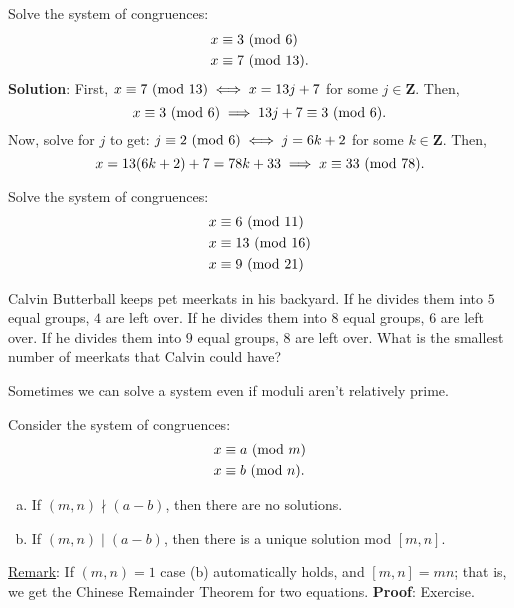 \begin{Example}{}{}
    Solve the system of congruences:
    \begin{align*}
        x & \equiv 3\ (\mathrm{mod}\ 6)   \\
        x & \equiv 7\ (\mathrm{mod}\ 13).
    \end{align*}
    \tcblower{}
    \textbf{Solution}: First, $ x\equiv 7\ (\mathrm{mod}\ 13)\iff x=13j+7 $ for some $ j\in\mathbf{Z} $. Then,
    \[ x\equiv 3\ (\mathrm{mod}\ 6)\implies 13j+7\equiv 3\ (\mathrm{mod}\ 6). \]
    Now, solve for $ j $ to get: $ j\equiv 2\ (\mathrm{mod}\ 6)\iff j=6k+2 $ for some $ k\in\mathbf{Z} $. Then,
    \[ x=13(6k+2)+7=78k+33\implies x\equiv 33\ (\mathrm{mod}\ 78). \]
\end{Example}
\begin{Exercise}{}{}
    Solve the system of congruences:
    \begin{align*}
        x & \equiv 6\ (\mathrm{mod}\ 11)  \\
        x & \equiv 13\ (\mathrm{mod}\ 16) \\
        x & \equiv 9\ (\mathrm{mod}\ 21)
    \end{align*}
\end{Exercise}
\begin{Exercise}{}{}
    Calvin Butterball keeps pet meerkats in his backyard. If he divides
    them into $5$ equal groups, $4$ are left over. If he divides them into $8$ equal groups, $6$
    are left over. If he divides them into $9$ equal groups, $8$ are left over. What is the
    smallest number of meerkats that Calvin could have?
\end{Exercise}
Sometimes we can solve a system even if moduli aren't relatively prime.
\begin{Theorem}{}{}
    Consider the system of congruences:
    \begin{align*}
        x & \equiv a\ (\mathrm{mod}\ m)  \\
        x & \equiv b\ (\mathrm{mod}\ n).
    \end{align*}
    \begin{enumerate}[(a)]
        \item If $ (m,n)\nmid (a-b) $, then there are no solutions.
        \item If $ (m,n)\mid (a-b) $, then there is a unique solution mod $ [m,n] $.
    \end{enumerate}
    \tcblower{}
    \underline{Remark}: If $ (m,n)=1 $ case (b) automatically holds, and $ [m,n]=mn $; that is, we get the
    Chinese Remainder Theorem for two equations.
    \tcblower{}
    \textbf{Proof}: Exercise.
\end{Theorem}

